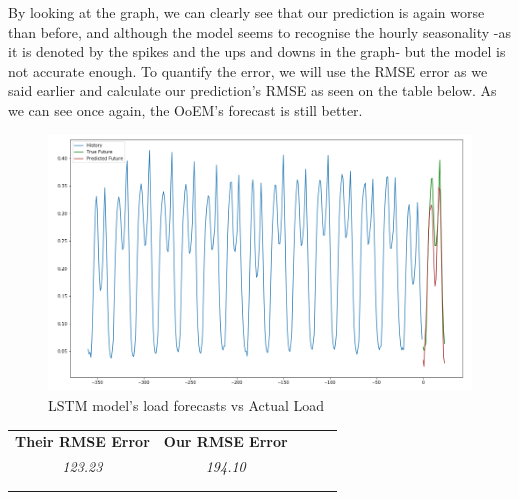 By looking at the graph, we can clearly see that our prediction is again worse than before, and although the model seems to recognise the hourly seasonality -as it is denoted by the spikes and the ups and downs in the graph- but the model is not accurate enough. To quantify the error, we will use the RMSE error as we said earlier and calculate our prediction's RMSE as seen on the table below. As we can see once again, the OoEM's forecast is still better.
\begin{figure}[ht!]
\centering
\includegraphics[width=0.9\linewidth]{project/nn.PNG}
\caption{LSTM model's load forecasts vs Actual Load}
\end{figure}
\begin{table}[ht!]
\centering
\begin{tabular}{lllll}
\cline{1-2}
\multicolumn{1}{|l|}{\textbf{Their RMSE Error}} & \multicolumn{1}{l|}{\textbf{Our RMSE Error}} &  &  &  \\ \cline{1-2}
\multicolumn{1}{|c|}{\textit{123.23}} & \multicolumn{1}{c|}{\textit{194.10}} &  &  &  \\ \cline{1-2}
                                &                                &  &  &  \\
                                &                                &  &  & 
\end{tabular}
\end{table}
\newpage

